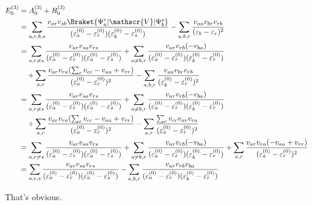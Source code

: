 \documentclass[a4paper]{article}
\begin{document}
\begin{align}
E_0^{(3)} &= A_0^{(3)} + B_0^{(3)} \notag\\
&= \sum_{a,r,b,s} 
\dfrac{v_{ar}v_{sb} \Braket{\Psi_a^r|\mathscr{V}|\Psi_b^s} }{(\varepsilon_a^{(0)} - \varepsilon_r^{(0)}) (\varepsilon_b^{(0)} - \varepsilon_s^{(0)})} 
- \sum_{a,b,r}\dfrac{v_{aa} v_{br}v_{rb}}{(\varepsilon_b - \varepsilon_r)^2}
\notag\\
&=  \sum_{a,r\neq s} 
\dfrac{v_{ar}v_{sa} v_{rs} }{(\varepsilon_a^{(0)} - \varepsilon_r^{(0)}) (\varepsilon_a^{(0)} - \varepsilon_s^{(0)})} 
+ \sum_{a\neq b,r} 
\dfrac{v_{ar}v_{rb}(-v_{ba}) }{(\varepsilon_a^{(0)} - \varepsilon_r^{(0)}) (\varepsilon_b^{(0)} - \varepsilon_r^{(0)})} 
\notag\\
&\quad {} + \sum_{a,r} 
\dfrac{v_{ar}v_{ra} (\sum_c v_{cc} - v_{aa} + v_{rr}) }{(\varepsilon_a^{(0)} - \varepsilon_r^{(0)})^2} 
- \sum_{a,b,r}\dfrac{v_{aa} v_{br}v_{rb}}{(\varepsilon_b^{(0)} - \varepsilon_r^{(0)})^2}
\notag\\
&=  \sum_{a,r\neq s} 
\dfrac{v_{ar}v_{sa} v_{rs} }{(\varepsilon_a^{(0)} - \varepsilon_r^{(0)}) (\varepsilon_a^{(0)} - \varepsilon_s^{(0)})} 
+ \sum_{a\neq b,r} 
\dfrac{v_{ar}v_{rb}(-v_{ba}) }{(\varepsilon_a^{(0)} - \varepsilon_r^{(0)}) (\varepsilon_b^{(0)} - \varepsilon_r^{(0)})} 
\notag\\
&\quad {} + \sum_{a,r} 
\dfrac{v_{ar}v_{ra} (\sum_c v_{cc} - v_{aa} + v_{rr}) }{(\varepsilon_a^{(0)} - \varepsilon_r^{(0)})^2} 
- \sum_{a,r}\dfrac{\sum_c v_{cc} v_{ar}v_{ra}}{(\varepsilon_a^{(0)} - \varepsilon_r^{(0)})^2}
\notag\\
&=  \sum_{a,r\neq s} 
\dfrac{v_{ar}v_{sa} v_{rs} }{(\varepsilon_a^{(0)} - \varepsilon_r^{(0)}) (\varepsilon_a^{(0)} - \varepsilon_s^{(0)})} 
+ \sum_{a\neq b,r} 
\dfrac{v_{ar}v_{rb}(-v_{ba}) }{(\varepsilon_a^{(0)} - \varepsilon_r^{(0)}) (\varepsilon_b^{(0)} - \varepsilon_r^{(0)})} 
+ \sum_{a,r} 
\dfrac{v_{ar}v_{ra} ( - v_{aa} + v_{rr}) }{(\varepsilon_a^{(0)} - \varepsilon_r^{(0)})^2} 
\notag\\
&=  \sum_{a,r,s} 
\dfrac{v_{ar}v_{sa} v_{rs} }{(\varepsilon_a^{(0)} - \varepsilon_r^{(0)}) (\varepsilon_a^{(0)} - \varepsilon_s^{(0)})} 
- \sum_{a,b,r} 
\dfrac{v_{ar}v_{rb}v_{ba} }{(\varepsilon_a^{(0)} - \varepsilon_r^{(0)}) (\varepsilon_b^{(0)} - \varepsilon_r^{(0)})} 
\end{align}

That's obvious.
\end{document}
